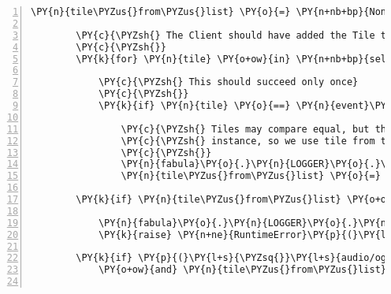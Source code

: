 \begin{Verbatim}[commandchars=\\\{\},numbers=left,firstnumber=1,stepnumber=1]
        \PY{n}{tile\PYZus{}from\PYZus{}list} \PY{o}{=} \PY{n+nb+bp}{None}

        \PY{c}{\PYZsh{} The Client should have added the Tile to self.host.room.tile\PYZus{}list}
        \PY{c}{\PYZsh{}}
        \PY{k}{for} \PY{n}{tile} \PY{o+ow}{in} \PY{n+nb+bp}{self}\PY{o}{.}\PY{n}{host}\PY{o}{.}\PY{n}{room}\PY{o}{.}\PY{n}{tile\PYZus{}list}\PY{p}{:}

            \PY{c}{\PYZsh{} This should succeed only once}
            \PY{c}{\PYZsh{}}
            \PY{k}{if} \PY{n}{tile} \PY{o}{==} \PY{n}{event}\PY{o}{.}\PY{n}{tile}\PY{p}{:}

                \PY{c}{\PYZsh{} Tiles may compare equal, but they may not refer to the same}
                \PY{c}{\PYZsh{} instance, so we use tile from tile\PYZus{}list.}
                \PY{c}{\PYZsh{}}
                \PY{n}{fabula}\PY{o}{.}\PY{n}{LOGGER}\PY{o}{.}\PY{n}{debug}\PY{p}{(}\PY{l+s}{\PYZdq{}}\PY{l+s}{found event.tile in self.host.room.tile\PYZus{}list}\PY{l+s}{\PYZdq{}}\PY{p}{)}
                \PY{n}{tile\PYZus{}from\PYZus{}list} \PY{o}{=} \PY{n}{tile}

        \PY{k}{if} \PY{n}{tile\PYZus{}from\PYZus{}list} \PY{o+ow}{is} \PY{n+nb+bp}{None}\PY{p}{:}

            \PY{n}{fabula}\PY{o}{.}\PY{n}{LOGGER}\PY{o}{.}\PY{n}{error}\PY{p}{(}\PY{l+s}{\PYZdq{}}\PY{l+s}{could not find tile \PYZob{}\PYZcb{} in tile\PYZus{}list of room }\PY{l+s}{\PYZsq{}}\PY{l+s}{\PYZob{}\PYZcb{}}\PY{l+s}{\PYZsq{}}\PY{l+s}{\PYZdq{}}\PY{o}{.}\PY{n}{format}\PY{p}{(}\PY{n}{event}\PY{o}{.}\PY{n}{tile}\PY{p}{,} \PY{n+nb+bp}{self}\PY{o}{.}\PY{n}{host}\PY{o}{.}\PY{n}{room}\PY{o}{.}\PY{n}{identifier}\PY{p}{)}\PY{p}{)}
            \PY{k}{raise} \PY{n+ne}{RuntimeError}\PY{p}{(}\PY{l+s}{\PYZdq{}}\PY{l+s}{could not find tile \PYZob{}\PYZcb{} in tile\PYZus{}list of room }\PY{l+s}{\PYZsq{}}\PY{l+s}{\PYZob{}\PYZcb{}}\PY{l+s}{\PYZsq{}}\PY{l+s}{\PYZdq{}}\PY{o}{.}\PY{n}{format}\PY{p}{(}\PY{n}{event}\PY{o}{.}\PY{n}{tile}\PY{p}{,} \PY{n+nb+bp}{self}\PY{o}{.}\PY{n}{host}\PY{o}{.}\PY{n}{room}\PY{o}{.}\PY{n}{identifier}\PY{p}{)}\PY{p}{)}

        \PY{k}{if} \PY{p}{(}\PY{l+s}{\PYZsq{}}\PY{l+s}{audio/ogg}\PY{l+s}{\PYZsq{}} \PY{o+ow}{in} \PY{n}{tile\PYZus{}from\PYZus{}list}\PY{o}{.}\PY{n}{assets}\PY{o}{.}\PY{n}{keys}\PY{p}{(}\PY{p}{)}
            \PY{o+ow}{and} \PY{n}{tile\PYZus{}from\PYZus{}list}\PY{o}{.}\PY{n}{assets}\PY{p}{[}\PY{l+s}{\PYZsq{}}\PY{l+s}{audio/ogg}\PY{l+s}{\PYZsq{}}\PY{p}{]}\PY{o}{.}\PY{n}{data} \PY{o+ow}{is} \PY{o+ow}{not} \PY{n+nb+bp}{None}\PY{p}{)}\PY{p}{:}


\end{Verbatim}
